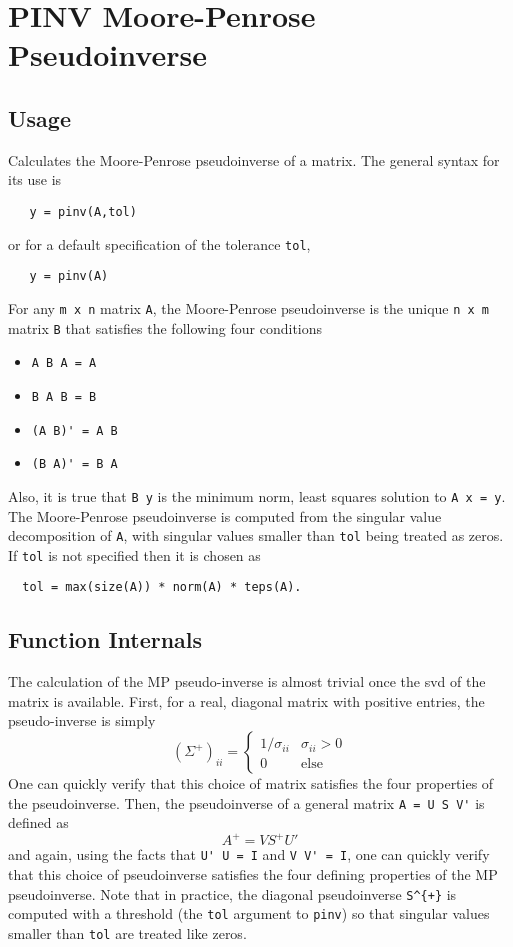 \section{PINV Moore-Penrose Pseudoinverse}

\subsection{Usage}

Calculates the Moore-Penrose pseudoinverse of a matrix.
The general syntax for its use is
\begin{verbatim}
   y = pinv(A,tol)
\end{verbatim}
or for a default specification of the tolerance \verb|tol|,
\begin{verbatim}
   y = pinv(A)
\end{verbatim}
For any \verb|m x n| matrix \verb|A|, the Moore-Penrose pseudoinverse
is the unique \verb|n x m| matrix \verb|B| that satisfies the following
four conditions
\begin{itemize}
\item  \verb|A B A = A|

\item  \verb|B A B = B|

\item  \verb|(A B)' = A B|

\item  \verb|(B A)' = B A|

\end{itemize}
Also, it is true that \verb|B y| is the minimum norm, least squares
solution to \verb|A x = y|.  The Moore-Penrose pseudoinverse is computed
from the singular value decomposition of \verb|A|, with singular values
smaller than \verb|tol| being treated as zeros.  If \verb|tol| is not specified
then it is chosen as
\begin{verbatim}
  tol = max(size(A)) * norm(A) * teps(A).
\end{verbatim}
\subsection{Function Internals}

The calculation of the MP pseudo-inverse is almost trivial once the
svd of the matrix is available.  First, for a real, diagonal matrix
with positive entries, the pseudo-inverse is simply
\[
  \left(\Sigma^{+}\right)_{ii} = \begin{cases}
             1/\sigma_{ii} & \sigma_{ii} > 0 \\
             0             & \mathrm{else} \end{cases}
\]
One can quickly verify that this choice of matrix satisfies the
four properties of the pseudoinverse.  Then, the pseudoinverse
of a general matrix \verb|A = U S V'| is defined as
\[
   A^{+} = V S^{+} U'
\]
and again, using the facts that \verb|U' U = I| and \verb|V V' = I|, one
can quickly verify that this choice of pseudoinverse satisfies the
four defining properties of the MP pseudoinverse.  Note that in
practice, the diagonal pseudoinverse \verb|S^{+}| is computed with
a threshold (the \verb|tol| argument to \verb|pinv|) so that singular
values smaller than \verb|tol| are treated like zeros.
